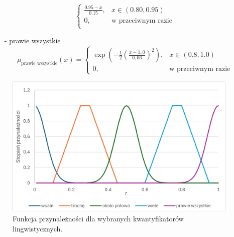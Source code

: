 \documentclass{article}
\begin{document}
\begin{itemize}
\begin{equation}
\begin{cases}
            \frac{0.95 - x}{0.15}, & x \in (0.80, 0.95)\\
            0, & \text{w przeciwnym razie} \\
            \end{cases}
        \end{equation}
    \item[-] prawie wszystkie
        \begin{equation}
            \mu_{\text{prawie wszystkie}}(x) =
            \begin{cases}
            \exp\left( -\frac{1}{2} \left( \frac{x - 1{,}0}{0,06} \right)^2 \right), &  x \in (0.8, 1.0) \\
            0, & \text{w przeciwnym razie}
            \end{cases}
        \end{equation}
\end{itemize}

\begin{figure}[H]
\centering
\includegraphics[width=\textwidth]{img/a.png}
\caption{Funkcja przynależności dla wybranych kwantyfikatorów lingwistycznych.}
\end{figure}
\end{document}
